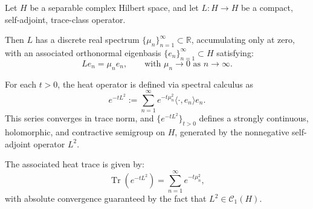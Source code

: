 \begin{definition}
\label{def:heat-operator}
Let \( H \) be a separable complex Hilbert space, and let \( L \colon H \to H \) be a compact, self-adjoint, trace-class operator.

Then \( L \) has a discrete real spectrum \( \{ \mu_n \}_{n=1}^\infty \subset \mathbb{R} \), accumulating only at zero, with an associated orthonormal eigenbasis \( \{ e_n \}_{n=1}^\infty \subset H \) satisfying:
\[
L e_n = \mu_n e_n, \qquad \text{with } \mu_n \to 0 \text{ as } n \to \infty.
\]

For each \( t > 0 \), the heat operator is defined via spectral calculus as
\[
e^{-tL^2} := \sum_{n=1}^\infty e^{-t \mu_n^2} \langle \cdot, e_n \rangle e_n.
\]
This series converges in trace norm, and \( \{ e^{-tL^2} \}_{t > 0} \) defines a strongly continuous, holomorphic, and contractive semigroup on \( H \), generated by the nonnegative self-adjoint operator \( L^2 \).

\medskip
\noindent
The associated heat trace is given by:
\[
\operatorname{Tr}(e^{-tL^2}) = \sum_{n=1}^\infty e^{-t \mu_n^2},
\]
with absolute convergence guaranteed by the fact that \( L^2 \in \mathcal{C}_1(H) \).
\end{definition}
% 